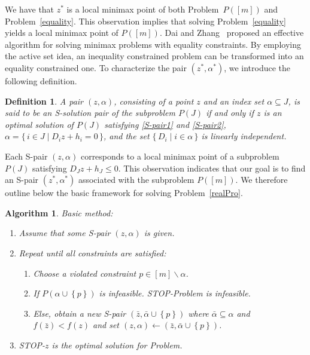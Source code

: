 \documentclass{article}
\newtheorem{definition}{Definition}
\newtheorem{algorithm}{Algorithm}
\begin{document}
	We have that $z^{\ast}$ is a local minimax point of both Problem~$P([m])$ and Problem~\eqref{equality}. 
	This observation implies that solving Problem~\eqref{equality} yields a local minimax point of $P([m])$. 
	Dai and Zhang~\cite{daiRateConvergenceAugmented2024} proposed an effective algorithm for solving minimax problems with equality constraints. 
	By employing the active set idea, an inequality constrained problem can be transformed into an equality constrained one. 
	To characterize the pair $(z^{\ast}, \alpha^{\ast})$, we introduce the following definition.
	
	\begin{definition}\label{definition of S-pair}
		A pair $(z, \alpha)$, consisting of a point $z$ and an index set $\alpha \subseteq J$, 
		is said to be an \emph{S-solution pair} of the subproblem $P(J)$ if and only if 
		$z$ is an optimal solution of $P(J)$ satisfying \eqref{S-pair1} and \eqref{S-pair2}, 
		$\alpha = \{\, i \in J \mid D_i z + h_i = 0 \,\}$, 
		and the set $\{\, D_i \mid i \in \alpha \,\}$ is linearly independent.
	\end{definition}
	
	Each S-pair $(z, \alpha)$ corresponds to a local minimax point of a subproblem $P(J)$ satisfying $D_{J}z + h_{J} \leq 0$. 
	This observation indicates that our goal is to find an S-pair $(z^{\ast}, \alpha^{\ast})$ associated with the subproblem $P([m])$. 
	We therefore outline below the basic framework for solving Problem~\eqref{realPro}.
	
	\begin{algorithm}{Basic method:}\label{Basic Method}
		\begin{enumerate}
			\item[Step 0] Assume that some S-pair $(z, \alpha)$ is given.
			\item[Step 1] Repeat until all constraints are satisfied:
			\begin{enumerate}
				\item Choose a violated constraint $p \in [m] \backslash\alpha$.
				\item If $P(\alpha\cup\left\lbrace p\right\rbrace)$ is infeasible. STOP-Problem is infeasible.
				\item Else, obtain a new S-pair $(\bar{z}, \bar{\alpha}\cup\left\lbrace p\right\rbrace)$ where $\bar{\alpha} \subseteq \alpha$ and $f(\bar{z}) < f(z)$ and set $(z, \alpha) \leftarrow (\bar{z}, \bar{\alpha}\cup\left\lbrace p\right\rbrace)$.
			\end{enumerate}
			\item[Step 2] STOP-$z$ is the optimal solution for Problem.
		\end{enumerate}
	\end{algorithm}
	
\end{document}
